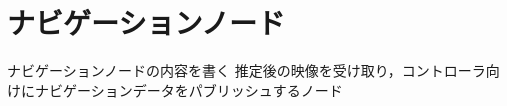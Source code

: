 \section{ナビゲーションノード}
\label{implement_navigation}

ナビゲーションノードの内容を書く
推定後の映像を受け取り，コントローラ向けにナビゲーションデータをパブリッシュするノード

